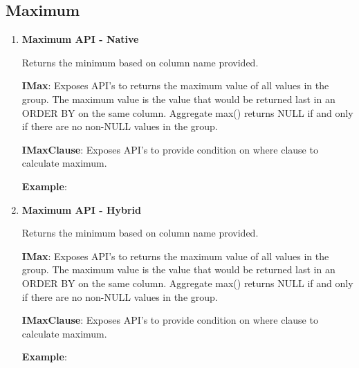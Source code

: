 	\subsection{Maximum} 
		
		\begin{enumerate}
		
			\item \small \textbf{Maximum API - Native}
				\par 
				Returns the minimum based on column name provided.
					
		
				\textbf{IMax}:    Exposes API's to returns the maximum value of all values in the group.
						The maximum value is the value that would be returned last in an ORDER BY on the same column. 
						Aggregate max() returns NULL if and only if there are no non-NULL values in the group.


					

			
				\textbf{IMaxClause}: Exposes API's to provide condition on where clause to calculate maximum.
					

				\textbf{Example}: 
					


			\item \small \textbf{Maximum API - Hybrid}
				\par 
				Returns the minimum based on column name provided.
					
		
				\textbf{IMax}:    Exposes API's to returns the maximum value of all values in the group.
						The maximum value is the value that would be returned last in an ORDER BY on the same column. 
						Aggregate max() returns NULL if and only if there are no non-NULL values in the group.


					

			
				\textbf{IMaxClause}: Exposes API's to provide condition on where clause to calculate maximum.
					

				\textbf{Example}: 
					

		\end{enumerate}



